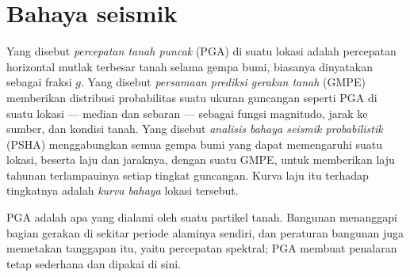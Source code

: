 \section{Bahaya seismik}\label{sec:b2:geological-hazards:seismic}

\begin{definition}\label{def:b2:geological-hazards:psha}
Yang disebut \emph{percepatan tanah puncak} (PGA) di suatu lokasi adalah percepatan
horizontal mutlak terbesar tanah selama gempa bumi, biasanya dinyatakan sebagai
fraksi $g$. Yang disebut \emph{persamaan prediksi gerakan tanah}
(GMPE) memberikan distribusi probabilitas suatu ukuran guncangan seperti PGA di suatu
lokasi --- median dan sebaran --- sebagai fungsi magnitudo, jarak ke sumber,
dan kondisi tanah. Yang disebut \emph{analisis bahaya seismik probabilistik}
(PSHA) menggabungkan semua gempa bumi yang dapat memengaruhi suatu lokasi, beserta
laju dan jaraknya, dengan suatu GMPE, untuk memberikan laju tahunan terlampauinya setiap tingkat guncangan.
Kurva laju itu terhadap tingkatnya adalah \emph{kurva
bahaya} lokasi tersebut.
\end{definition}

PGA adalah apa yang dialami oleh suatu partikel tanah. Bangunan menanggapi bagian
gerakan di sekitar periode alaminya sendiri, dan peraturan bangunan juga memetakan tanggapan itu, yaitu percepatan spektral;
PGA membuat penalaran tetap sederhana dan dipakai di sini.

